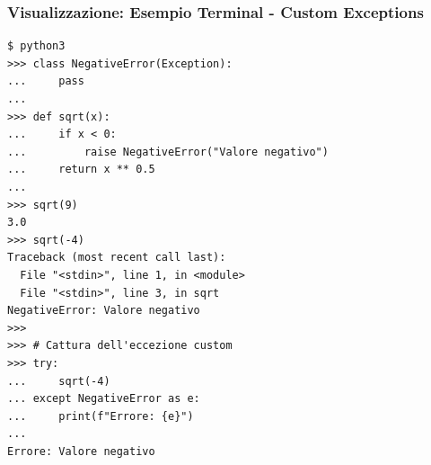 \subsubsection{Visualizzazione: Esempio Terminal - Custom Exceptions}
\begin{tcolorbox}[colback=black!5, colframe=black!70, title=Output Terminal - Eccezioni Personalizzate, fonttitle=\bfseries\color{white}, coltitle=black]
\begin{lstlisting}[style=python]
$ python3
>>> class NegativeError(Exception):
...     pass
...
>>> def sqrt(x):
...     if x < 0:
...         raise NegativeError("Valore negativo")
...     return x ** 0.5
...
>>> sqrt(9)
3.0
>>> sqrt(-4)
Traceback (most recent call last):
  File "<stdin>", line 1, in <module>
  File "<stdin>", line 3, in sqrt
NegativeError: Valore negativo
>>>
>>> # Cattura dell'eccezione custom
>>> try:
...     sqrt(-4)
... except NegativeError as e:
...     print(f"Errore: {e}")
...
Errore: Valore negativo
\end{lstlisting}
\end{tcolorbox}

